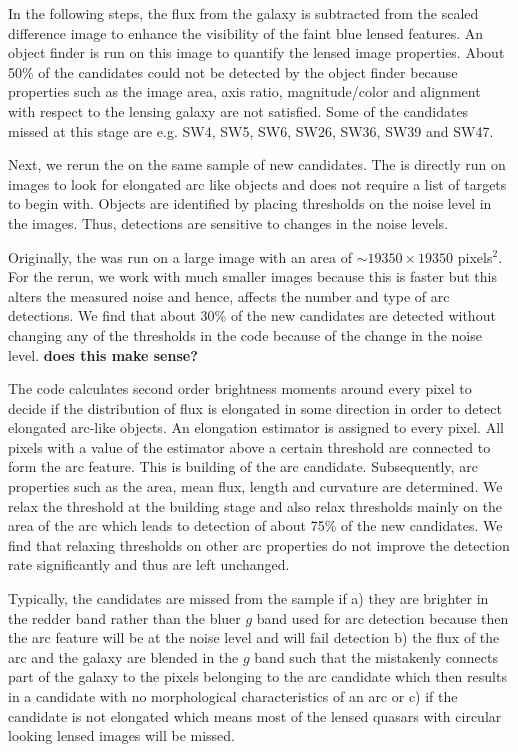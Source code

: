 \documentclass[useAMS,usenatbib,a4paper]{mn2e}
\begin{document}

In the following steps, the flux from the galaxy is subtracted from the
scaled difference image to enhance the visibility of the faint blue
lensed features. An object finder is run on this image to quantify the
lensed image properties. About 50\% of the \sw candidates could not be
detected by the object finder because properties such as the image area,
axis ratio, magnitude/color and alignment with respect to the lensing
galaxy are not satisfied. Some of the candidates missed at this stage
are e.g. SW4, SW5, SW6, SW26, SW36, SW39 and SW47. 


Next, we rerun the \af on the same \sw sample of new candidates. The \af
is directly run on images to look for elongated arc like objects and does
not require a list of targets to begin with. Objects are identified by
placing thresholds on the noise level in the images. Thus, \af
detections are sensitive to changes in the noise levels. 

Originally, the \af was run on a large image with an area of $\sim 19350
\times 19350$ pixels$^2$. For the rerun, we work with much smaller
images because this is faster but this alters the measured
noise and hence, affects the number and type of arc detections. We find
that about 30\% of the new candidates are detected without changing any
of the thresholds in the code because of the change in the noise level.
{\bf does this make sense?}

The \af code calculates second order brightness moments around every
pixel to decide if the distribution of flux is elongated in some
direction in order to detect elongated arc-like objects. An elongation
estimator is assigned to every pixel. All pixels with a value of the
estimator above a certain threshold are connected to form the arc
feature. This is building of the arc candidate. Subsequently, arc
properties such as the area, mean flux, length and curvature are
determined. We relax the threshold at the building stage and also relax
thresholds mainly on the area of the arc which leads to detection of
about 75\% of the new \sw candidates. We find that relaxing thresholds
on other arc properties do not improve the detection rate significantly
and thus are left unchanged.

Typically, the candidates are missed from the \af sample if a) they are
brighter in the redder band rather than the bluer $g$ band used for arc
detection because then the arc feature will be at the noise level and
will fail detection b) the flux of the arc and the galaxy are
blended in the $g$ band such that the \af mistakenly connects part of the
galaxy to the pixels belonging to the arc candidate which then results in a
candidate with no morphological characteristics of an arc or c) if the
candidate is not elongated which means most of the lensed quasars with
circular looking lensed images will be missed. 
\end{document}
